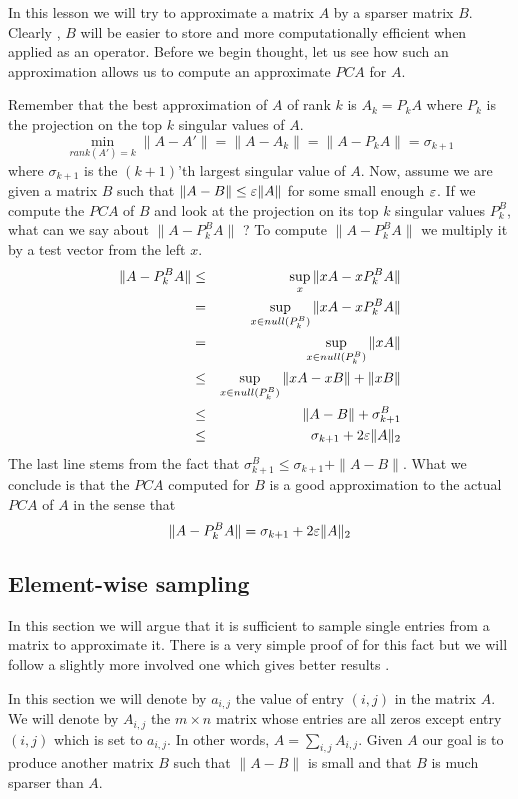 


In this lesson we will try to approximate a matrix $A$ by a sparser matrix $B$. 
Clearly , $B$ will be easier to store and more computationally efficient when applied as an operator.
Before we begin thought, let us see how such an approximation allows us to compute an approximate $PCA$ for $A$.

Remember that the best approximation of $A$ of rank $k$ is $A_k = P_k A$ where $P_k$ is the projection on the top $k$ singular values of $A$. 
\[
\min_{rank(A') = k} \|A - A'\| = \|A - A_k\| = \|A - P_k A\|  = \sigma_{k+1}
\]
where $\sigma_{k+1}$ is the $(k+1)$'th largest singular value of $A$.
Now, assume we are given a matrix $B$ such that $\|A - B\| \le \varepsilon \|A\|$ for some small enough $\varepsilon$.
If we compute the $PCA$ of $B$ and look at the projection on its top $k$ singular values $P_k^B$, what can we say about $ \|A - P_k^B A\|$ ?
To compute $\|A - P_k^B A\|$ we multiply it by a test vector from the left $x$.
\begin{eqnarray}
\|A - P_k^B A\| &\le& \sup_x \|xA - xP_k^B A\| \\
&=& \sup_{x \in null (P_k^B)} \|xA - xP_k^B A\| \\
&=&\sup_{x \in null (P_k^B)} \|xA\| \\
&\le& \sup_{x \in null (P_k^B)} \|xA - xB\| + \|xB\| \\
&\le& \|A - B\| + \sigma_{k+1}^B\\
&\le& \sigma_{k+1} + 2\varepsilon\|A\|_2
\end{eqnarray}
The last line stems from the fact that $\sigma_{k+1}^B \le \sigma_{k+1} + \|A - B\|$. 
What we conclude is that the $PCA$ computed for $B$ is a good approximation to the actual $PCA$ of $A$ in the sense that
\[
\|A - P_k^B A\|  = \sigma_{k+1} + 2\varepsilon\|A\|_2
\]

\subsection*{Element-wise sampling}
In this section we will argue that it is sufficient to sample single entries from a matrix to approximate it.
There is a very simple proof of for this fact \cite{AroraHaKaFRS06} but we will follow a slightly more involved one which gives better results \cite{DrineasZouziasMatrixSampling10}.

In this section we will denote by $a_{i,j}$ the value of entry $(i,j)$ in the matrix $A$.
We will denote by $A_{i,j}$ the $m \times n$ matrix whose entries are all zeros except entry $(i,j)$ which is set to $a_{i,j}$.
In other words, $A = \sum_{i,j} A_{i,j}$. Given $A$ our goal is to produce another matrix $B$ such that $\|A - B\|$ is small and that $B$ is much sparser than $A$.

